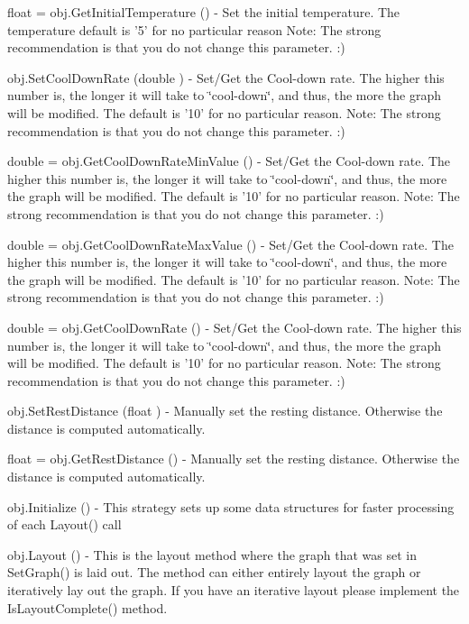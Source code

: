 \begin{DoxyItemize}
\item {\ttfamily float = obj.\-Get\-Initial\-Temperature ()} -\/ Set the initial temperature. The temperature default is '5' for no particular reason Note\-: The strong recommendation is that you do not change this parameter. \-:)  
\item {\ttfamily obj.\-Set\-Cool\-Down\-Rate (double )} -\/ Set/\-Get the Cool-\/down rate. The higher this number is, the longer it will take to \char`\"{}cool-\/down\char`\"{}, and thus, the more the graph will be modified. The default is '10' for no particular reason. Note\-: The strong recommendation is that you do not change this parameter. \-:)  
\item {\ttfamily double = obj.\-Get\-Cool\-Down\-Rate\-Min\-Value ()} -\/ Set/\-Get the Cool-\/down rate. The higher this number is, the longer it will take to \char`\"{}cool-\/down\char`\"{}, and thus, the more the graph will be modified. The default is '10' for no particular reason. Note\-: The strong recommendation is that you do not change this parameter. \-:)  
\item {\ttfamily double = obj.\-Get\-Cool\-Down\-Rate\-Max\-Value ()} -\/ Set/\-Get the Cool-\/down rate. The higher this number is, the longer it will take to \char`\"{}cool-\/down\char`\"{}, and thus, the more the graph will be modified. The default is '10' for no particular reason. Note\-: The strong recommendation is that you do not change this parameter. \-:)  
\item {\ttfamily double = obj.\-Get\-Cool\-Down\-Rate ()} -\/ Set/\-Get the Cool-\/down rate. The higher this number is, the longer it will take to \char`\"{}cool-\/down\char`\"{}, and thus, the more the graph will be modified. The default is '10' for no particular reason. Note\-: The strong recommendation is that you do not change this parameter. \-:)  
\item {\ttfamily obj.\-Set\-Rest\-Distance (float )} -\/ Manually set the resting distance. Otherwise the distance is computed automatically.  
\item {\ttfamily float = obj.\-Get\-Rest\-Distance ()} -\/ Manually set the resting distance. Otherwise the distance is computed automatically.  
\item {\ttfamily obj.\-Initialize ()} -\/ This strategy sets up some data structures for faster processing of each Layout() call  
\item {\ttfamily obj.\-Layout ()} -\/ This is the layout method where the graph that was set in Set\-Graph() is laid out. The method can either entirely layout the graph or iteratively lay out the graph. If you have an iterative layout please implement the Is\-Layout\-Complete() method.  

\end{DoxyItemize}

